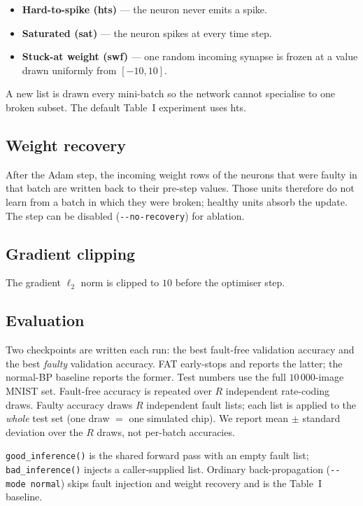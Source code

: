 \documentclass[conference]{IEEEtran}
\begin{document}
\begin{itemize}
  \item \textbf{Hard-to-spike (hts)} --- the neuron never emits a spike.
  \item \textbf{Saturated (sat)} --- the neuron spikes at every time step.
  \item \textbf{Stuck-at weight (swf)} --- one random incoming synapse is
        frozen at a value drawn uniformly from $[-10,10]$.
\end{itemize}

A new list is drawn every mini-batch so the network cannot specialise to
one broken subset. The default Table~I experiment uses hts.

\subsection{Weight recovery}
After the Adam step, the incoming weight rows of the neurons that were
faulty in that batch are written back to their pre-step values. Those
units therefore do not learn from a batch in which they were broken;
healthy units absorb the update. The step can be disabled
(\texttt{-{}-no-recovery}) for ablation.

\subsection{Gradient clipping}
The gradient $\ell_2$ norm is clipped to $10$ before the optimiser step.

\subsection{Evaluation}
Two checkpoints are written each run: the best fault-free validation
accuracy and the best \emph{faulty} validation accuracy. FAT early-stops
and reports the latter; the normal-BP baseline reports the former.
Test numbers use the full $10\,000$-image MNIST set. Fault-free accuracy
is repeated over $R$ independent rate-coding draws. Faulty accuracy draws
$R$ independent fault lists; each list is applied to the \emph{whole}
test set (one draw $=$ one simulated chip). We report mean $\pm$
standard deviation over the $R$ draws, not per-batch accuracies.

\texttt{good\_inference()} is the shared forward pass with an empty
fault list; \texttt{bad\_inference()} injects a caller-supplied list.
Ordinary back-propagation (\texttt{-{}-mode normal}) skips fault
injection and weight recovery and is the Table~I baseline.
\end{document}

